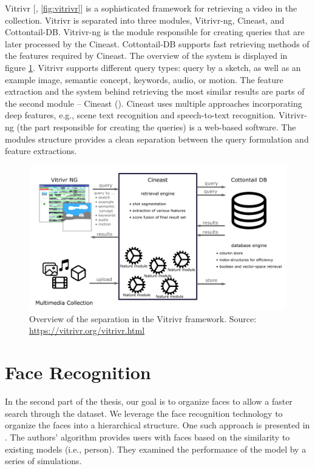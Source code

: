 Vitrivr [\cite{rossetto2016vitrivr}, \autoref{fig:vitrivr}] is a sophisticated framework for retrieving a video in the collection. Vitrivr is separated into three modules, Vitrivr-ng, Cineast, and Cottontail-DB.  Vitrivr-ng is the module responsible for creating queries that are later processed by the Cineast. Cottontail-DB supports fast retrieving methods of the features required by Cineast. The overview of the system is displayed in figure \ref{fig:vitrivr}. Vitrivr supports different query types: query by a sketch, as well as an example image, semantic concept, keywords, audio, or motion. The feature extraction and the system behind retrieving the most similar results are parts of the second module -- Cineast (\cite{rossetto2016searching}). Cineast uses multiple approaches incorporating deep features, e.g., scene text recognition and speech-to-text recognition. Vitrivr-ng (the part responsible for creating the queries) is a web-based software. The modules structure provides a clean separation between the query formulation and feature extractions.

\begin{figure}
    \centering
    \includegraphics[width=\linewidth]{img/vitrivr.png}
    \caption[Overview of the separation in the Vitrivr framework]{Overview of the separation in the Vitrivr framework. Source: \url{https://vitrivr.org/vitrivr.html}}
    \label{fig:vitrivr}
\end{figure}

\section{Face Recognition}

In the second part of the thesis, our goal is to organize faces to allow a faster search through the dataset. We leverage the face recognition technology to organize the faces into a hierarchical structure. One such approach is presented in \citep{girgensohn2004leveraging}. The authors' algorithm provides users with faces based on the similarity to existing models (i.e., person). They examined the performance of the model by a series of simulations. 

